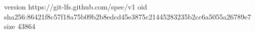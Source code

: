 version https://git-lfs.github.com/spec/v1
oid sha256:86421f8c57f18a75b09b2b8edcd45e3875c21445283235b2cc6a5055a26789e7
size 43864
